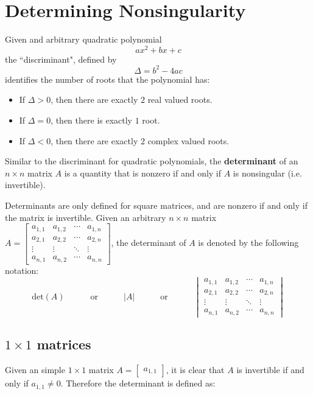 \documentclass{article}
\begin{document}
\section*{Determining Nonsingularity}

Given and arbitrary quadratic polynomial
\[ax^2 + bx + c\]
the ``discriminant", defined by
\[\Delta = b^2 - 4ac\] 
identifies the number of roots that the polynomial has:
\begin{itemize}
\item If \(\Delta > 0\), then there are exactly \(2\) real valued roots.
\item If \(\Delta = 0\), then there is exactly \(1\) root.
\item If \(\Delta < 0\), then there are exactly \(2\) complex valued roots.
\end{itemize}

Similar to the discriminant for quadratic polynomials, the {\bf determinant} of an \(n \times n\) matrix \(A\) is a quantity that is nonzero if and only if \(A\) is nonsingular (i.e. invertible).  

Determinants are only defined for square matrices, and are nonzero if and only if the matrix is invertible. Given an arbitrary \(n \times n\) matrix \(A = \begin{bmatrix} a_{1,1} & a_{1,2} & \cdots & a_{1,n} \\ a_{2,1} & a_{2,2} & \cdots & a_{2,n} \\ \vdots & \vdots & \ddots & \vdots \\ a_{n,1} & a_{n,2} & \cdots & a_{n,n} \end{bmatrix}\), the determinant of \(A\) is denoted by the following notation:
\[\text{det}(A) \quad\quad\quad \text{or} \quad\quad\quad |A| \quad\quad\quad \text{or} \quad\quad\quad \begin{vmatrix} a_{1,1} & a_{1,2} & \cdots & a_{1,n} \\ a_{2,1} & a_{2,2} & \cdots & a_{2,n} \\ \vdots & \vdots & \ddots & \vdots \\ a_{n,1} & a_{n,2} & \cdots & a_{n,n} \end{vmatrix}\]


\subsection*{$1 \times 1$ matrices}

Given an simple \(1 \times 1\) matrix \(A = \begin{bmatrix} a_{1,1} \end{bmatrix}\), it is clear that \(A\) is invertible if and only if \(a_{1,1} \neq 0\). Therefore the determinant is defined as:
\end{document}

